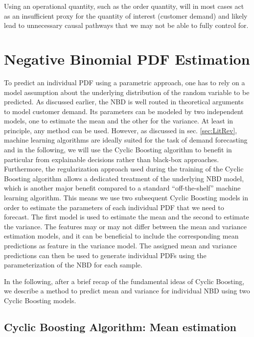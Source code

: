 \documentclass[BCOR=1mm, DIV=calc,10pt,
twoside=true,
twocolumn,
headings=normal]{scrartcl}
\begin{document}
Using an operational quantity, such as the order quantity, will in most cases act as an insufficient proxy for the quantity of interest (customer demand) and likely lead to unnecessary causal pathways that we may not be able to fully control for. 


\section{Negative Binomial PDF Estimation}
\label{sec:pdfEstimation}

To predict an individual PDF using a parametric approach, one has to rely on a model assumption about the underlying distribution of the random variable to be predicted. As discussed earlier, the NBD is well routed in theoretical arguments to model customer demand. Its parameters can be modeled by two independent models, one to estimate the mean and the other for the variance. At least in principle, any method can be used. However, as discussed in sec. \ref{sec:LitRev}, machine learning algorithms are ideally suited for the task of demand forecasting and in the following, we will use the Cyclic Boosting algorithm to benefit in particular from explainable decisions rather than black-box approaches. Furthermore, the regularization approach used during the training of the Cyclic Boosting algorithm allows a dedicated treatment of the underlying NBD model, which is another major benefit compared to a standard ``off-the-shelf'' machine learning algorithm. This means we use two subsequent Cyclic Boosting models in order to estimate the parameters of each individual PDF that we need to forecast. The first model is used to estimate the mean and the second to estimate the variance. The features may or may not differ between the mean and variance estimation models, and it can be beneficial to include the corresponding mean predictions as feature in the variance model. The assigned mean and variance predictions can then be used to generate individual PDFs using the parameterization of the NBD for each sample.

In the following, after a brief recap of the fundamental ideas of Cyclic Boosting, we describe a method to predict mean and variance for individual NBD using two Cyclic Boosting models.

\subsection{Cyclic Boosting Algorithm: Mean estimation}
\label{sec:CB}
\end{document}
